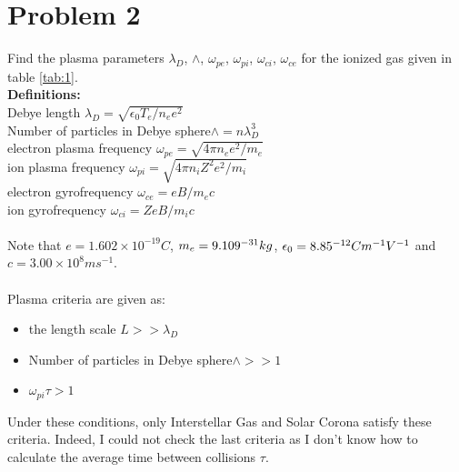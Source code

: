 \documentclass[11pt]{amsart}
\begin{document}
 \section*{Problem 2 }
 
Find the plasma parameters $\lambda_D$, \textbf{$\wedge$}, $\omega_{pe}$, $\omega_{pi}$, $\omega_{ci}$, $\omega_{ce}$ for the ionized gas given in table \ref{tab:1}.
\\
\textbf{Definitions:}\\
Debye length $\lambda_D=\sqrt{\epsilon_0 T_e /n_e e^2}$
\\
Number of particles in Debye sphere$\wedge=n \lambda_{D}^3$
\\
electron plasma frequency $\omega_{pe}=\sqrt{4 \pi n_e e^2 /m_e }$
\\
ion plasma frequency $\omega_{pi}=\sqrt{4 \pi n_i Z^2 e^2 /m_i }$
\\
electron gyrofrequency $\omega_{ce}=e B/m_e c$
\\
ion gyrofrequency $\omega_{ci}=Z e B/m_i c$
\\
\\
Note that $e=1.602\times 10 ^{-19} C$, $m_e=9.109\time 10^{-31} kg$, $\epsilon_0=8.85\time 10^{-12} C m^{-1} V^{-1}$ and $c=3.00\times 10 ^{8} m s^{-1}$. 
\\
\\
Plasma criteria are given as:
\begin{itemize}
\item the length scale $L>>\lambda_D$
\item Number of particles in Debye sphere$\wedge>>1$
\item $\omega_{pi}\tau>1$
\end{itemize}
Under these conditions, only Interstellar Gas and Solar Corona satisfy these criteria. Indeed, I could not check the last criteria as I don't know how to calculate the average time between collisions $\tau$.
\newpage
\end{document}
